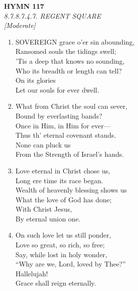 \documentclass[11pt,a4paper]{article}
\begin{document}
\newpage
\begin{center}
    {\Large \textbf{HYMN 117}}
    \\
    \textit{8.7.8.7.4.7. REGENT SQUARE}
    \\
    \textit{\small [Moderate]}
\end{center}
\vspace{1em}

\begin{enumerate}
    \item SOVEREIGN grace o'er sin abounding, \\
        Ransomed souls the tidings swell; \\
        'Tis a deep that knows no sounding, \\
        Who its breadth or length can tell? \\
        On its glories \\
        Let our souls for ever dwell.

    \item What from Christ the soul can sever, \\
        Bound by everlasting bands? \\
        Once in Him, in Him for ever--- \\
        Thus th' eternal covenant stands. \\
        None can pluck us \\
        From the Strength of Israel's hands.

    \item Love eternal in Christ chose us, \\
        Long ere time its race began. \\
        Wealth of heavenly blessing shows us \\
        What the love of God has done; \\
        With Christ Jesus, \\
        By eternal union one.

    \item On such love let us still ponder, \\
        Love so great, so rich, so free; \\
        Say, while lost in holy wonder, \\
        ``Why are we, Lord, loved by Thee?'' \\
        Hallelujah! \\
        Grace shall reign eternally.

\end{enumerate}
\end{document}
